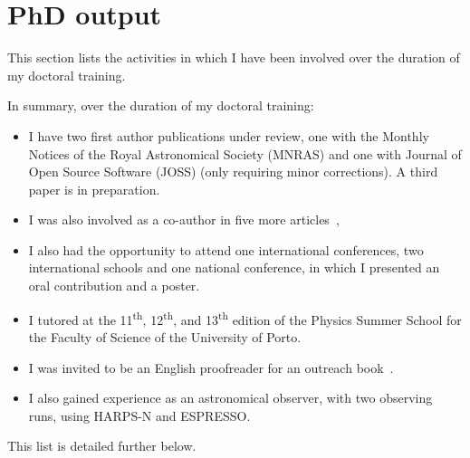 \chapter{PhD output}\label{appendix:phd_output}

This section lists the activities in which I have been involved over the duration of my doctoral training.

In summary, over the duration of my doctoral training:
\begin{itemize}
    \item I have two first author publications under review, one with the Monthly Notices of the Royal Astronomical Society (MNRAS) and one with Journal of Open Source Software (JOSS) (only requiring minor corrections).
    A third paper is in preparation.%
    \item I was also involved as a co-author in five more articles~\citep{figueira_radial_2016, barros_precise_2017, santerne_earthsized_2018, lillo-box_troy_2018, ulmer-moll_telluric_2018},
    \item I also had the opportunity to attend one international conferences, two international schools and one national conference, in which I presented an oral contribution and a poster.
    \item I tutored at the 11\textsuperscript{th}, 12\textsuperscript{th}, and 13\textsuperscript{th} edition of the Physics Summer School for the Faculty of Science of the University of Porto.
    \item I was invited to be an English proofreader for an outreach book~\citet{figueira_astro_2015}.
    \item I also gained experience as an astronomical observer, with two observing runs, using {HARPS-N} and {ESPRESSO}.
\end{itemize}

This list is detailed further below.

\clearpage


\clearpage


\clearpage


\clearpage


\clearpage


\clearpage


\clearpage

